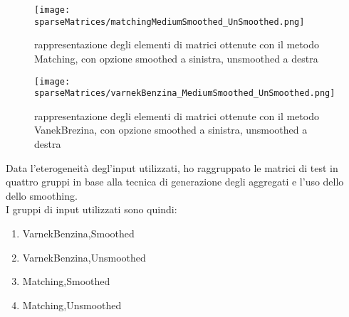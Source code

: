 \begin{figure}[H]
  \centering \texttt{[image: sparseMatrices/matchingMediumSmoothed\_UnSmoothed.png]}
  \caption{rappresentazione degli elementi \nnz di matrici ottenute con il metodo Matching, con opzione smoothed a sinistra, unsmoothed a destra}
  \decoRule \label{fig:sparseMatrix}
\end{figure}
\begin{figure}[H]
  \centering \texttt{[image: sparseMatrices/varnekBenzina\_MediumSmoothed\_UnSmoothed.png]}
  \caption{rappresentazione degli elementi \nnz di matrici ottenute con il metodo VanekBrezina, con opzione smoothed a sinistra, unsmoothed a destra}
  \decoRule \label{fig:sparseMatrix1}
\end{figure}
\label{inputClasses}
Data l'eterogeneità degl'input utilizzati, 
ho raggruppato le matrici di test in quattro gruppi in base alla tecnica di generazione degli aggregati %
e l'uso dello dello smoothing.\\
I gruppi di input utilizzati sono quindi: 
\begin{enumerate}
	\item VarnekBenzina,Smoothed
	\item VarnekBenzina,Unsmoothed
	\item Matching,Smoothed
	\item Matching,Unsmoothed
\end{enumerate}

